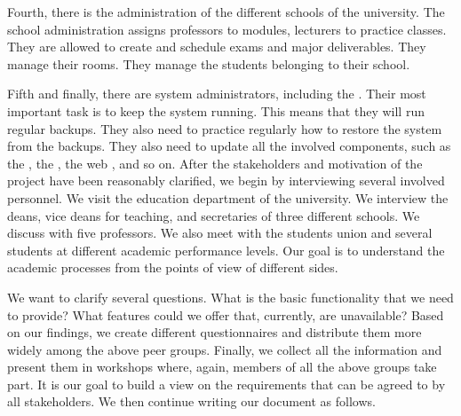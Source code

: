 Fourth, there is the administration of the different schools of the university.
The school administration assigns professors to modules, lecturers to practice classes.
They are allowed to create and schedule exams and major deliverables.
They manage their rooms.
They manage the students belonging to their school.

Fifth and finally, there are system administrators, including the .
Their most important task is to keep the system running.
This means that they will run regular backups.
They also need to practice regularly how to restore the system from the backups.
They also need to update all the involved components, such as the , the \dbms, the web , and so on.%
\endhsection%
%
\endhsection%
%
%
After the stakeholders and motivation of the project have been reasonably clarified, we begin by interviewing several involved personnel.
We visit the education department of the university.
We interview the deans, vice deans for teaching, and secretaries of three different schools.
We discuss with five professors.
We also meet with the students union and several students at different academic performance levels.
Our goal is to understand the academic processes from the points of view of different sides.

We want to clarify several questions.
What is the basic functionality that we need to provide?
What features could we offer that, currently, are unavailable?
Based on our findings, we create different questionnaires and distribute them more widely among the above peer groups.
Finally, we collect all the information and present them in workshops where, again, members of all the above groups take part.
It is our goal to build a view on the requirements that can be agreed to by all stakeholders.
We then continue writing our  document as follows.

